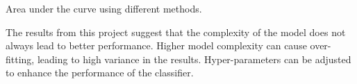 \begin{table}[!ht]
\centering
{}
\caption{Area under the curve using different methods.}\label{tb:aucR}
\end{table}

The results from this project suggest that the complexity of the model does not always lead to better performance. Higher model complexity can cause over-fitting, leading to high variance in the results. Hyper-parameters can be adjusted to enhance the performance of the classifier.
